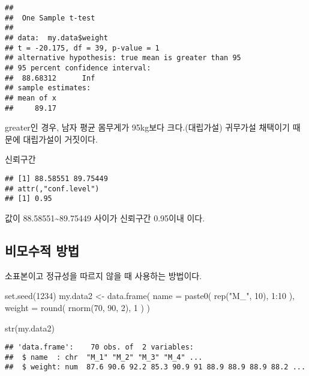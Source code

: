 \documentclass[
]{article}
\newenvironment{Shaded}{\begin{snugshade}}{\end{snugshade}}
\newcommand{\AttributeTok}[1]{\textcolor[rgb]{0.77,0.63,0.00}{#1}}
\newcommand{\DecValTok}[1]{\textcolor[rgb]{0.00,0.00,0.81}{#1}}
\newcommand{\FunctionTok}[1]{\textcolor[rgb]{0.00,0.00,0.00}{#1}}
\newcommand{\NormalTok}[1]{#1}
\newcommand{\OtherTok}[1]{\textcolor[rgb]{0.56,0.35,0.01}{#1}}
\newcommand{\SpecialCharTok}[1]{\textcolor[rgb]{0.00,0.00,0.00}{#1}}
\newcommand{\StringTok}[1]{\textcolor[rgb]{0.31,0.60,0.02}{#1}}
\begin{document}
\begin{verbatim}
## 
##  One Sample t-test
## 
## data:  my.data$weight
## t = -20.175, df = 39, p-value = 1
## alternative hypothesis: true mean is greater than 95
## 95 percent confidence interval:
##  88.68312      Inf
## sample estimates:
## mean of x 
##     89.17
\end{verbatim}

greater인 경우, 남자 평균 몸무게가 95kg보다 크다.(대립가설) 귀무가설 채택이기 때문에 대립가설이 거짓이다.

신뢰구간

\begin{Shaded}
\end{Shaded}

\begin{verbatim}
## [1] 88.58551 89.75449
## attr(,"conf.level")
## [1] 0.95
\end{verbatim}

값이 88.58551\textasciitilde89.75449 사이가 신뢰구간 0.95이내 이다.

\hypertarget{uxbe44uxbaa8uxc218uxc801-uxbc29uxbc95}{%
\subsection{비모수적 방법}\label{uxbe44uxbaa8uxc218uxc801-uxbc29uxbc95}}

소표본이고 정규성을 따르지 않을 때 사용하는 방법이다.

\begin{Shaded}
\begin{Highlighting}[]
\FunctionTok{set.seed}\NormalTok{(}\DecValTok{1234}\NormalTok{)}
\NormalTok{my.data2 }\OtherTok{\textless{}{-}} \FunctionTok{data.frame}\NormalTok{( }\AttributeTok{name =} \FunctionTok{paste0}\NormalTok{( }\FunctionTok{rep}\NormalTok{(}\StringTok{"M\_"}\NormalTok{, }\DecValTok{10}\NormalTok{), }\DecValTok{1}\SpecialCharTok{:}\DecValTok{10}\NormalTok{ ), }\AttributeTok{weight =} \FunctionTok{round}\NormalTok{( }\FunctionTok{rnorm}\NormalTok{(}\DecValTok{70}\NormalTok{, }\DecValTok{90}\NormalTok{, }\DecValTok{2}\NormalTok{), }\DecValTok{1}\NormalTok{ ) )}

\FunctionTok{str}\NormalTok{(my.data2)}
\end{Highlighting}
\end{Shaded}

\begin{verbatim}
## 'data.frame':    70 obs. of  2 variables:
##  $ name  : chr  "M_1" "M_2" "M_3" "M_4" ...
##  $ weight: num  87.6 90.6 92.2 85.3 90.9 91 88.9 88.9 88.9 88.2 ...
\end{verbatim}
\end{document}
